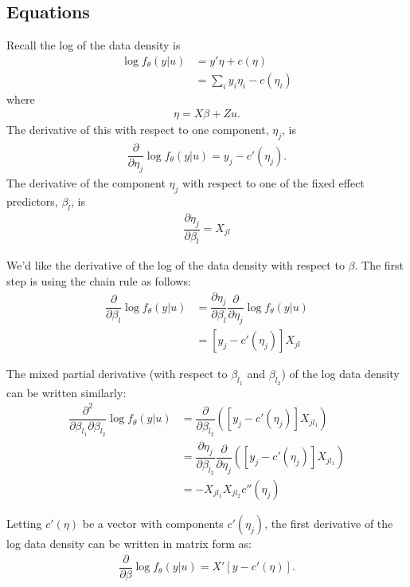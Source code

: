 \documentclass{article}
\begin{document}
\subsection{Equations}
Recall the log of the data density is
\begin{align}
\log f_\theta(y|u) &= y' \eta +c(\eta) \\
&= \sum_{i} y_{i} {\eta_{i}} - c({\eta_{i}})
\end{align}
where
\begin{align}
\eta=X\beta+Zu.
\end{align}
The derivative of this with respect to one component, $\eta_j$, is
\begin{align}
\dfrac{\partial}{\partial \eta_j} \log f_\theta(y|u)  = y_j-c'(\eta_j).
\end{align}
The derivative of the component $\eta_j$ with respect to one of the fixed effect predictors, $\beta_{l}$, is
\begin{align}
\dfrac{\partial \eta_j}{\partial \beta_{l}} = X_{j{l}}
\end{align}

We'd like the derivative of the log of the data density with respect to $\beta$. The first step is using the chain rule as follows:
\begin{align}
\dfrac{\partial}{\partial \beta_{l}}  \log f_\theta(y|u) &= \dfrac{\partial \eta_j}{\partial \beta_{l}} \dfrac{\partial}{\partial \eta_j} \log f_\theta(y|u) \\
&= \left[ y_j-c'(\eta_j) \right]  X_{j{l}}
\end{align}

The mixed partial derivative (with respect to $\beta_{l_1}$ and $\beta_{l_2}$) of the log data density can be written similarly:
\begin{align}
\dfrac{\partial^2}{\partial \beta_{l_1} \partial \beta_{l_2}}  \log f_\theta(y|u) &=\dfrac{\partial}{\partial \beta_{l_2}} \left( \left[ y_j-c'(\eta_j) \right]  X_{j{l_1}} \right) \\
&= \dfrac{\partial \eta_j}{\partial \beta_{l_2}} \dfrac{\partial}{\partial \eta_j} \left( \left[ y_j-c'(\eta_j) \right]  X_{j{l_1}} \right) \\
&= -X_{j{l_1}} X_{j{l_2}} c''(\eta_j) 
 \end{align}


Letting $c'(\eta)$ be a vector with components $c'(\eta_j)$, the first derivative of the log data density can be written in matrix form as:
\begin{align}
\dfrac{\partial}{\partial \beta}  \log f_\theta(y|u) = X' \left[ y-  c'(\eta)  \right].
\end{align}
\end{document}
